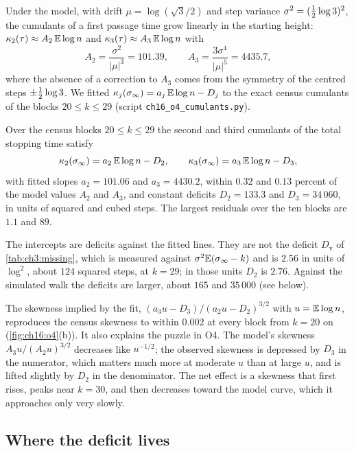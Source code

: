 Under the model, with drift $\mu=\log(\sqrt3/2)$ and step variance
$\sigma^2=(\tfrac{1}{2}\log3)^2$, the cumulants of a first passage time grow linearly
in the starting height: $\kappa_2(\tau)\approx A_2\,\mathbb{E}\log n$ and
$\kappa_3(\tau)\approx A_3\,\mathbb{E}\log n$ with
\[
  A_2=\frac{\sigma^2}{|\mu|^3}=101.39,\qquad A_3=\frac{3\sigma^4}{|\mu|^5}=4435.7,
\]
where the absence of a correction to $A_3$ comes from the symmetry of the
centred steps $\pm\tfrac{1}{2}\log3$. We fitted $\kappa_j(\sigma_\infty)=a_j\,\mathbb{E}\log n-D_j$ to the
exact census cumulants of the blocks $20\le k\le29$ (script
\texttt{ch16\_o4\_cumulants.py}).

\begin{proposition}\label{prop:ch16:deficit}
Over the census blocks $20\le k\le29$ the second and third cumulants of the
total stopping time satisfy
\[
  \kappa_2(\sigma_\infty)=a_2\,\mathbb{E}\log n-D_2,\qquad \kappa_3(\sigma_\infty)=a_3\,\mathbb{E}\log n-D_3,
\]
with fitted slopes $a_2=101.06$ and $a_3=4430.2$, within $0.32$ and $0.13$
percent of the model values $A_2$ and $A_3$, and constant deficits
$D_2=133.3$ and $D_3=34\,060$, in units of squared and cubed steps. The largest
residuals over the ten blocks are $1.1$ and $89$.
\end{proposition}

The intercepts are deficits against the fitted lines. They are not the deficit $D_{\mathrm v}$ of \cref{tab:ch3:missing}, which is measured against $\sigma^2\mathbb{E}(\sigma_\infty-k)$ and is $2.56$ in units of $\log^2$, about $124$ squared steps, at $k=29$; in those units $D_2$ is $2.76$. Against the simulated walk the deficits are larger, about $165$ and $35\,000$ (see below).

The skewness implied by the fit, $(a_3u-D_3)/(a_2u-D_2)^{3/2}$ with $u=\mathbb{E}\log n$,
reproduces the census skewness to within $0.002$ at every block from $k=20$ on
(\cref{fig:ch16:o4}(b)). It also explains the puzzle in O4. The model's
skewness $A_3u/(A_2u)^{3/2}$ decreases like $u^{-1/2}$; the observed skewness is
depressed by $D_3$ in the numerator, which matters much more at moderate $u$ than
at large $u$, and is lifted slightly by $D_2$ in the denominator. The net effect
is a skewness that first rises, peaks near $k=30$, and then decreases toward
the model curve, which it approaches only very slowly.

\subsection{Where the deficit lives}


